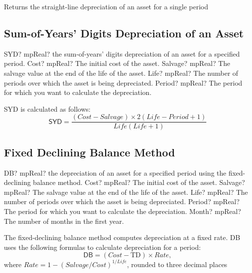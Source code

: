 \vspace{0.3cm}
Returns the straight-line depreciation of an asset for a single period


\subsection{Sum-of-Years' Digits Depreciation of an Asset}


\begin{mpFunctionsExtract}
	\mpWorksheetFunctionFourNotImplemented
	{SYD? mpReal? the sum-of-years' digits depreciation of an asset for a specified period.}
	{Cost? mpReal?  The initial cost of the asset.}
	{Salvage? mpReal? The salvage value at the end of the life of the asset.}
	{Life? mpReal? The number of periods over which the asset is being depreciated.}
	{Period? mpReal? The period for which you want to calculate the depreciation.}
\end{mpFunctionsExtract}

\vspace{0.3cm}
SYD is calculated as follows:
\begin{equation}
	\textsf{SYD} = \frac{(\textit{Cost}-\textit{Salvage}) \times 2(\textit{Life}-\textit{Period}+1)}{\textit{Life}(\textit{Life}+1)}
\end{equation}




\subsection{Fixed Declining Balance Method}

\begin{mpFunctionsExtract}
	\mpWorksheetFunctionFiveNotImplemented
	{DB? mpReal? the depreciation of an asset for a specified period using the fixed-declining balance method.}
	{Cost? mpReal?  The initial cost of the asset.}
	{Salvage? mpReal? The salvage value at the end of the life of the asset.}
	{Life? mpReal? The number of periods over which the asset is being depreciated.}
	{Period? mpReal? The period for which you want to calculate the depreciation.}
	{Month? mpReal? The number of months in the first year.}
\end{mpFunctionsExtract}

\vspace{0.3cm}
The fixed-declining balance method computes depreciation at a fixed rate. DB uses the following formulas to calculate depreciation for a period:
\begin{equation}
	\textsf{DB} = (Cost - \text{TD}) \times Rate,
\end{equation}
where $Rate = 1 - (Salvage / Cost)^{1 / \textit{Life}}$, rounded to three decimal places

